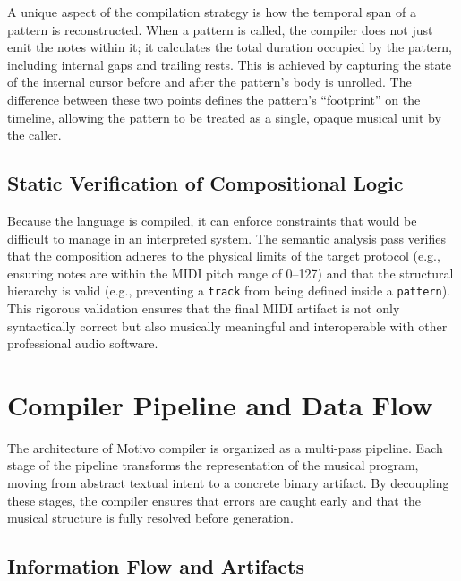 A unique aspect of the compilation strategy is how the temporal span of a pattern is reconstructed.
When a pattern is called, the compiler does not just emit the notes within it; it calculates the total duration occupied
by the pattern, including internal gaps and trailing rests.
This is achieved by capturing the state of the internal cursor before and after the pattern's body is unrolled.
The difference between these two points defines the pattern's ``footprint'' on the timeline, allowing the pattern to be
treated as a single, opaque musical unit by the caller.

\subsection{Static Verification of Compositional Logic}\label{detail-subsec:static-verification-of-compositional-logic}

Because the language is compiled, it can enforce constraints that would be difficult to manage in an interpreted system.
The semantic analysis pass verifies that the composition adheres to the physical limits of the target protocol (e.g.,
ensuring notes are within the MIDI pitch range of 0--127) and that the structural hierarchy is valid (e.g., preventing a
\texttt{track} from being defined inside a \texttt{pattern}).
This rigorous validation ensures that the final MIDI artifact is not only syntactically correct but also musically
meaningful and interoperable with other professional audio software.


\section{Compiler Pipeline and Data Flow}\label{detail-sec:compiler-flow}

The architecture of Motivo compiler is organized as a multi-pass pipeline.
Each stage of the pipeline transforms the representation of the musical program, moving from abstract textual intent to
a concrete binary artifact.
By decoupling these stages, the compiler ensures that errors are caught early and that the musical structure is fully
resolved before generation.

\subsection{Information Flow and Artifacts}\label{detail-subsec:information-flow-and-artifacts}

